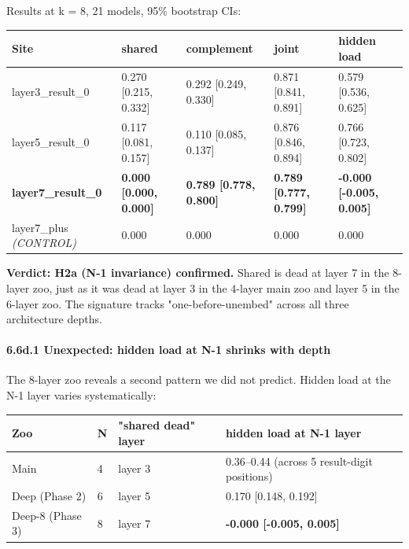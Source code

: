 Results at k = 8, 21 models, 95\% bootstrap CIs:

\begin{center}
\begin{tabular}{|l|l|l|l|l|}
\hline
\textbf{Site} & \textbf{shared} & \textbf{complement} & \textbf{joint} & \textbf{hidden load} \\
\hline
layer3\_result\_0 & 0.270 [0.215, 0.332] & 0.292 [0.249, 0.330] & 0.871 [0.841, 0.891] & 0.579 [0.536, 0.625] \\
layer5\_result\_0 & 0.117 [0.081, 0.157] & 0.110 [0.085, 0.137] & 0.876 [0.846, 0.894] & 0.766 [0.723, 0.802] \\
\textbf{layer7\_result\_0} & \textbf{0.000 [0.000, 0.000]} & \textbf{0.789 [0.778, 0.800]} & \textbf{0.789 [0.777, 0.799]} & \textbf{-0.000 [-0.005, 0.005]} \\
layer7\_plus \emph{(CONTROL)} & 0.000 & 0.000 & 0.000 & 0.000 \\
\hline
\end{tabular}
\end{center}


\textbf{Verdict: H2a (N-1 invariance) confirmed.} Shared is dead at layer 7
in the 8-layer zoo, just as it was dead at layer 3 in the 4-layer main
zoo and layer 5 in the 6-layer zoo. The signature tracks
"one-before-unembed" across all three architecture depths.

\paragraph{6.6d.1 Unexpected: hidden load at N-1 shrinks with depth}

The 8-layer zoo reveals a second pattern we did not predict. Hidden
load at the N-1 layer varies systematically:

\begin{center}
\begin{tabular}{|l|l|l|l|}
\hline
\textbf{Zoo} & \textbf{N} & \textbf{"shared dead" layer} & \textbf{hidden load at N-1 layer} \\
\hline
Main & 4 & layer 3 & 0.36--0.44 (across 5 result-digit positions) \\
Deep (Phase 2) & 6 & layer 5 & 0.170 [0.148, 0.192] \\
Deep-8 (Phase 3) & 8 & layer 7 & \textbf{-0.000 [-0.005, 0.005]} \\
\hline
\end{tabular}
\end{center}



